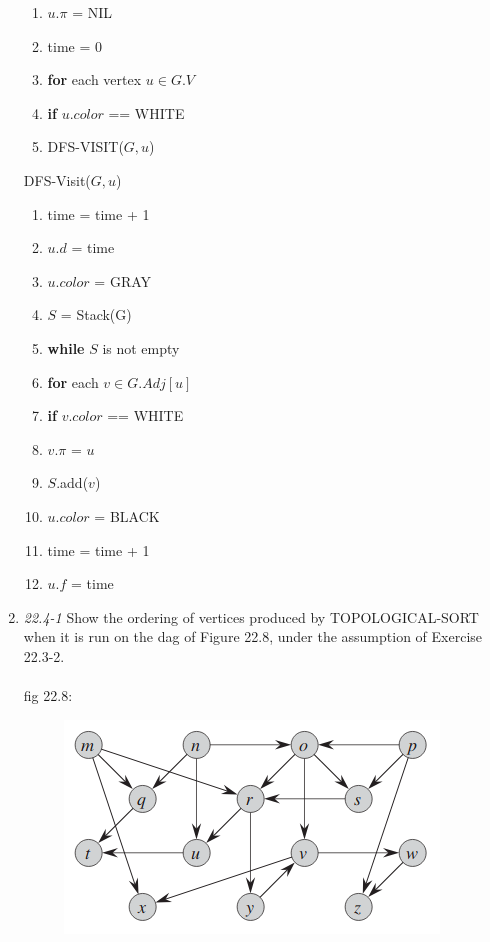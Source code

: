 \documentclass[]{memoir}
\begin{document}
\begin{enumerate}
\begin{enumerate}[label=\arabic*\hspace{2mm}]
\item \hspace{1cm} $u.\pi$ = NIL 
\item time = 0
\item \textbf{for} each vertex $u \in G.V$
\item \hspace{1cm} \textbf{if} $u.color$ == WHITE
\item \hspace{2cm} DFS-VISIT($G,u$) 
\end{enumerate}
DFS-Visit($G,u$)
\begin{enumerate}[label=\arabic*\hspace{2mm}]
\item time = time + 1
\item $u.d$ = time
\item $u.color$ = GRAY
\item $S$ = Stack(G)
\item \textbf{while} $S$ is not empty
\item \hspace{1cm} \textbf{for} each $v \in G.Adj[u]$
\item \hspace{2cm} \textbf{if} $v.color$ == WHITE 
\item \hspace{3cm} $v.\pi$ = $u$
\item \hspace{3cm} $S$.add($v$)
\item \hspace{2cm} $u.color$ = BLACK
\item \hspace{2cm} time = time + 1
\item \hspace{2cm} $u.f$ = time
\end{enumerate} 
\item \textit{22.4-1} Show the ordering of vertices produced by TOPOLOGICAL-SORT when it is run on the dag of Figure 22.8, under the assumption of Exercise 22.3-2.
\paragraph{} fig 22.8:
\begin{figure}[h]
	\centering
	\includegraphics[scale=.5]{fig22-8}
\end{figure}

\end{enumerate}
\end{document}
